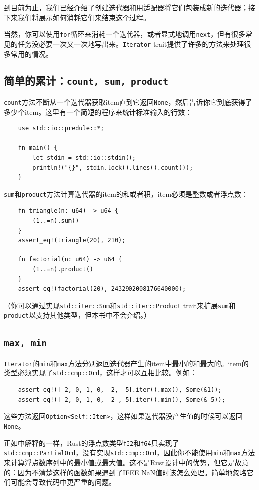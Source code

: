 到目前为止，我们已经介绍了创建迭代器和用适配器将它们包装成新的迭代器；接下来我们将展示如何消耗它们来结束这个过程。

当然，你可以使用\texttt{for}循环来消耗一个迭代器，或者显式地调用\texttt{next}，但有很多常见的任务没必要一次又一次地写出来。\texttt{Iterator} trait提供了许多的方法来处理很多常用的情况。

\subsection{简单的累计：\texttt{count, sum, product}}
\texttt{count}方法不断从一个迭代器获取item直到它返回\texttt{None}，然后告诉你它到底获得了多少个item。这里有一个简短的程序来统计标准输入的行数：
\begin{verbatim}
    use std::io::predule::*;

    fn main() {
        let stdin = std::io::stdin();
        println!("{}", stdin.lock().lines().count());
    }
\end{verbatim}

\texttt{sum}和\texttt{product}方法计算迭代器的item的和或者积，item必须是整数或者浮点数：
\begin{verbatim}
    fn triangle(n: u64) -> u64 {
        (1..=n).sum()
    }
    assert_eq!(triangle(20), 210);

    fn factorial(n: u64) -> u64 {
        (1..=n).product()
    }
    assert_eq!(factorial(20), 2432902008176640000);
\end{verbatim}

（你可以通过实现\texttt{std::iter::Sum}和\texttt{std::iter::Product} trait来扩展\texttt{sum}和\texttt{product}以支持其他类型，但本书中不会介绍。）

\subsection{\texttt{max, min}}
\texttt{Iterator}的\texttt{min}和\texttt{max}方法分别返回迭代器产生的item中最小的和最大的。item的类型必须实现了\texttt{std::cmp::Ord}，这样才可以互相比较。例如：
\begin{verbatim}
    assert_eq!([-2, 0, 1, 0, -2, -5].iter().max(), Some(&1));
    assert_eq!([-2, 0, 1, 0, -2 ,-5].iter().min(), Some(&-5));
\end{verbatim}

这些方法返回\texttt{Option<Self::Item>}，这样如果迭代器没产生值的时候可以返回\texttt{None}。

正如中解释的一样，Rust的浮点数类型\texttt{f32}和\texttt{f64}只实现了\\
\texttt{std::cmp::PartialOrd}，没有实现\texttt{std::cmp::Ord}，因此你不能使用\texttt{min}和\texttt{max}方法来计算浮点数序列中的最小值或最大值。这不是Rust设计中的优势，但它是故意的：因为不清楚这样的函数如果遇到了IEEE NaN值时该怎么处理。简单地忽略它们可能会导致代码中更严重的问题。

